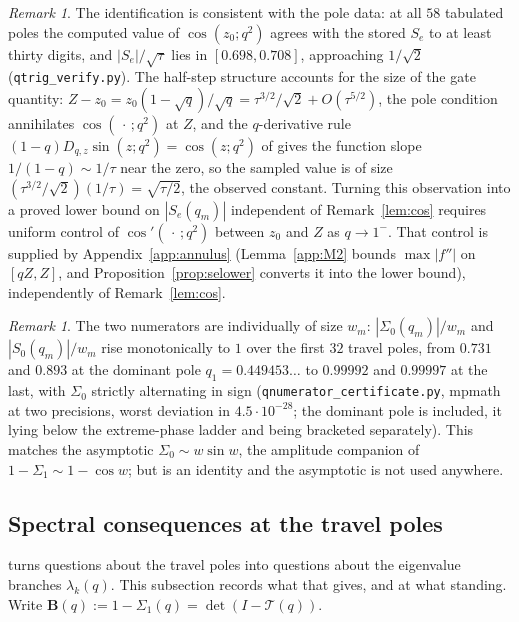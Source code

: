 \documentclass[11pt]{article}
\theoremstyle{plain}
\theoremstyle{definition}
\theoremstyle{remark}
\newtheorem{remark}[theorem]{Remark}
\begin{document}
\begin{remark}\label{rem:qtrig}
The identification is consistent with the pole data: at all $58$ tabulated poles the computed value
of $\cos(z_0;q^2)$ agrees with the stored $S_e$ to at least thirty digits, and $|S_e|/\sqrt\tau$
lies in $[0.698,0.708]$, approaching $1/\sqrt2$ (\texttt{qtrig\_verify.py}). The half-step
structure accounts for the size of the gate quantity: $Z-z_0=z_0(1-\sqrt q)/\sqrt q
=\tau^{3/2}/\sqrt2+O(\tau^{5/2})$, the pole condition annihilates $\cos(\,\cdot\,;q^2)$ at
$Z$, and the $q$-derivative rule $(1-q)D_{q,z}\sin(z;q^2)=\cos(z;q^2)$ of \cite{KS1992} gives the
function slope $1/(1-q)\sim1/\tau$ near the zero, so the sampled value is of size
$(\tau^{3/2}/\sqrt2)(1/\tau)=\sqrt{\tau/2}$, the observed constant. Turning this observation into a proved lower bound on
$|S_e(q_m)|$ independent of Remark~\ref{lem:cos} requires uniform control of
$\cos'(\,\cdot\,;q^2)$ between $z_0$ and $Z$ as $q\to1^-$. That control is supplied by
Appendix~\ref{app:annulus} (Lemma~\ref{app:M2} bounds $\max|f''|$ on $[qZ,Z]$, and
Proposition~\ref{prop:selower} converts it into the lower bound), independently of
Remark~\ref{lem:cos}.
\end{remark}

\begin{remark}\label{rem:numsize}
The two numerators are individually of size $w_m$: $|\Sigma_0(q_m)|/w_m$ and $|S_0(q_m)|/w_m$ rise
monotonically to $1$ over the first $32$ travel poles, from $0.731$ and $0.893$ at the dominant
pole $q_1=0.449453\ldots$ to $0.99992$ and $0.99997$ at the last, with $\Sigma_0$ strictly
alternating in sign
(\texttt{qnumerator\_certificate.py}, mpmath at two precisions, worst deviation in
{\cite[\textup{(eq:numprod)}]{Bonfioli2026bA}} $4.5\cdot10^{-28}$; the dominant pole is included, it lying below the
extreme-phase ladder and being bracketed separately). This matches the asymptotic
$\Sigma_0\sim w\sin w$, the
amplitude companion of $1-\Sigma_1\sim1-\cos w$; but {\cite[\textup{(eq:numprod)}]{Bonfioli2026bA}} is an identity and the
asymptotic is not used anywhere.
\end{remark}

\subsection{Spectral consequences at the travel poles}\label{sec:spectral}

{\cite[Theorem ``the travel determinant'', \textup{thm:fredholm}]{Bonfioli2026bA}} turns questions about the travel poles into questions about the
eigenvalue branches $\lambda_k(q)$. This subsection records what that gives, and at what standing.
Write $\mathbf B(q):=1-\Sigma_1(q)=\det(I-\mathcal T(q))$.
\end{document}
